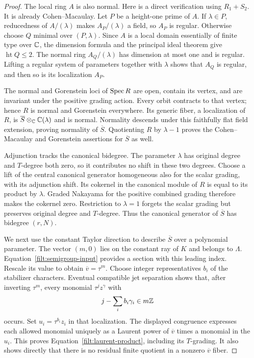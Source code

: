 \begin{proof}
The local ring $A$ is also normal.  Here is a direct verification using
$R_1+S_2$.  It is already Cohen--Macaulay.  Let $P$ be a height-one
prime of $A$.  If $\lambda\in P$, reducedness of $A/(\lambda)$ makes
$A_P/(\lambda)$ a field, so $A_P$ is regular.  Otherwise choose $Q$
minimal over $(P,\lambda)$.  Since $A$ is a local domain essentially of
finite type over $\mathbb C$, the dimension formula and the principal ideal
theorem give $\operatorname{ht}Q\leq2$.  The normal ring
$A_Q/(\lambda)$ has dimension at most one and is regular.  Lifting a
regular system of parameters together with $\lambda$ shows that $A_Q$
is regular, and then so is its localization $A_P$.

The normal and Gorenstein loci of $\operatorname{Spec} R$ are open, contain its
vertex, and are invariant under the positive grading action.  Every
orbit contracts to that vertex; hence $R$ is normal and Gorenstein
everywhere.  Its generic fiber, a localization of $R$, is
$\overline S\otimes_{\mathbb C}\mathbb C(\lambda)$ and is normal.  Normality
descends under this faithfully flat field extension, proving normality
of $\overline S$.  Quotienting $R$ by $\lambda-1$ proves the
Cohen--Macaulay and Gorenstein assertions for $\overline S$ as well.

Adjunction tracks the canonical bidegree.  The parameter $\lambda$ has
original degree and $T$-degree both zero, so it contributes no shift in
these two degrees.  Choose a lift of the central canonical generator
homogeneous also for the scalar grading, with its adjunction shift.
Its cokernel in the canonical module of $R$ is equal to its product by
$\lambda$.  Graded Nakayama for the positive combined grading therefore
makes the cokernel zero.  Restriction to $\lambda=1$ forgets the scalar
grading but preserves original degree and $T$-degree.  Thus the canonical
generator of $\overline S$ has bidegree $(r,N)$.

We next use the constant Taylor direction to describe $\overline S$ over
a polynomial parameter.  The vector $(m,0)$ lies on the constant ray of
$K$ and belongs to $\Lambda$.  Equation~\eqref{filt:semigroup-input} provides a section with
this leading index.  Rescale its value to obtain
$\overline v=\tau^m$.  Choose integer representatives $b_i$ of the
stabilizer characters.  Eventual compatible jet separation shows that,
after inverting $\tau^m$, every monomial $\tau^jz^\gamma$ with
\[
 j-\sum_i b_i\gamma_i\in m\mathbb Z
\]
occurs.  Set $u_i=\tau^{b_i}z_i$ in that localization.  The displayed
congruence expresses each allowed monomial uniquely as a Laurent power
of $\overline v$ times a monomial in the $u_i$.  This proves
Equation~\eqref{filt:laurent-product}, including its $T$-grading.  It also
shows directly that there is no residual finite quotient in a nonzero
$\overline v$ fiber.


\end{proof}
